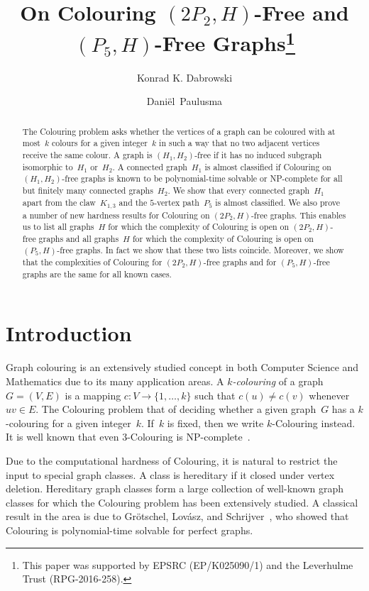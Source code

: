 \documentclass{llncs}
\title{On Colouring $(2P_2,H)$-Free and $(P_5,H)$-Free Graphs\thanks{This paper was supported by EPSRC (EP/K025090/1) and the Leverhulme Trust (RPG-2016-258).}}
\author{Konrad K. Dabrowski \and Dani\"el~Paulusma}
\institute{Department of Computer Science, Durham University,\\
Science Laboratories, South Road, Durham DH1 3LE, United Kingdom\\
\texttt{\{konrad.dabrowski,daniel.paulusma\}@durham.ac.uk}}
\newcommand{\NP}{{\sf NP}}
\begin{document}
\maketitle
\begin{abstract}
The {\sc Colouring} problem asks whether the vertices of a graph can be coloured with at most~$k$ colours for a given integer~$k$ in such a way that no two adjacent vertices receive the same colour.
A graph is $(H_1,H_2)$-free if it has no induced subgraph isomorphic to~$H_1$ or~$H_2$.
A connected graph~$H_1$ is almost classified if {\sc Colouring} on $(H_1,H_2)$-free graphs is known to be polynomial-time solvable or \NP-complete for all but finitely many connected graphs~$H_2$.
We show that every connected graph~$H_1$ apart from the claw~$K_{1,3}$ and the $5$-vertex path~$P_5$ is almost classified.
We also prove a number of new hardness results for {\sc Colouring} on $(2P_2,H)$-free graphs.
This enables us to list all graphs~$H$ for which the complexity of {\sc Colouring} is open on $(2P_2,H)$-free graphs and all graphs~$H$ for which the complexity of {\sc Colouring} is open on $(P_5,H)$-free graphs.
In fact we show that these two lists coincide.
Moreover, we show that the complexities of {\sc Colouring} for $(2P_2,H)$-free graphs and for $(P_5,H)$-free graphs are the same for all known cases.
\end{abstract}

\section{Introduction}\label{s-intro}

Graph colouring is an extensively studied concept in both Computer Science and Mathematics due to its many application areas.
A {\em $k$-colouring} of a graph~$G=(V,E)$ is a mapping $c:V\to \{1,\dots,k\}$ such that $c(u)\neq c(v)$ whenever $uv\in E$.
The {\sc Colouring} problem that of deciding whether a given graph~$G$ has a $k$-colouring for a given integer~$k$.
If~$k$ is fixed, then we write $k$-{\sc Colouring} instead.
It is well known that even {\sc $3$-Colouring} is \NP-complete~\cite{Lo73}.

Due to the computational hardness of {\sc Colouring}, it is natural to restrict the input to special graph classes.
A class is hereditary if it closed under vertex deletion.
Hereditary graph classes form a large collection of well-known graph classes for which the {\sc Colouring} problem has been extensively studied.
A classical result in the area is due to Gr\"otschel, Lov\'asz, and Schrijver~\cite{GLS84}, who showed that {\sc Colouring} is polynomial-time solvable for perfect graphs.
\end{document}
